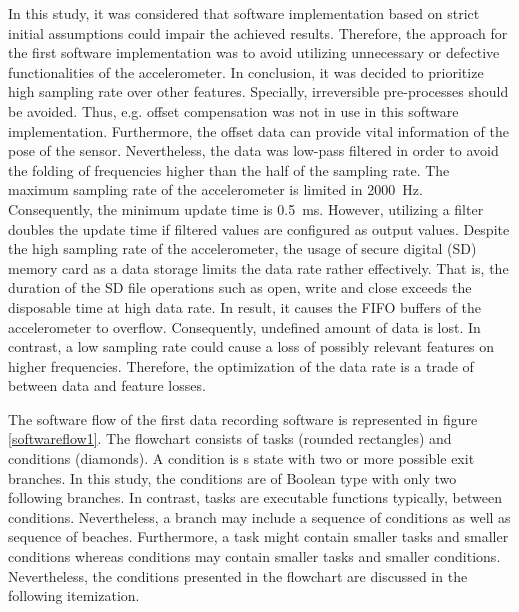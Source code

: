 \documentclass[english,12pt,a4paper,pdftex,elec,utf8]{aaltothesis}
\begin{document}
In this study, it was considered that software implementation based on strict initial assumptions could impair the achieved results. Therefore, the approach for the first software implementation was to avoid utilizing unnecessary  or defective functionalities of the accelerometer. In conclusion, it was decided to prioritize high sampling rate over other features. Specially, irreversible pre-processes should be avoided. Thus, e.g. offset compensation was not in use in this software implementation. Furthermore, the offset data can provide vital information of the pose of the sensor. Nevertheless, the data was low-pass filtered in order to avoid the folding of frequencies higher than the half of the sampling rate. The maximum sampling rate of the accelerometer is limited in \SI{2000}{\hertz}. Consequently, the minimum update time is \SI{0.5}{\milli\second}. However, utilizing a filter doubles the update time if filtered values are configured as output values. Despite the high sampling rate of the accelerometer, the usage of secure digital (SD) memory card as a data storage limits the data rate rather effectively. That is, the duration of the SD file operations such as open, write and close exceeds the disposable time at high data rate. In result, it causes the FIFO buffers of the accelerometer to overflow. Consequently, undefined amount of data is lost. In contrast, a low sampling rate could cause a loss of possibly relevant features on higher frequencies. Therefore, the optimization of the data rate is a trade of between data and feature losses.

The software flow of the first data recording software is represented in figure \ref{softwareflow1}. The flowchart consists of tasks (rounded rectangles) and conditions (diamonds). A condition is s state with two or more possible exit branches. In this study, the conditions are of Boolean type with only two following branches. In contrast, tasks are executable functions typically, between conditions. Nevertheless, a branch may include a sequence of conditions as well as sequence of beaches. Furthermore, a task might contain smaller tasks and smaller conditions whereas conditions may contain smaller tasks and smaller conditions. Nevertheless, the conditions presented in the flowchart are discussed in the following itemization.
\end{document}
